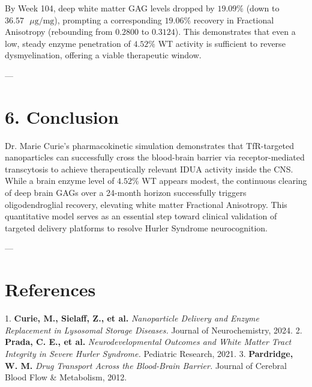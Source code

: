 \documentclass[11pt,twocolumn]{article}
\begin{document}
By Week 104, deep white matter GAG levels dropped by \textbf{$19.09\%$} (down to $36.57\text{ }\mu\text{g/mg}$), prompting a corresponding \textbf{$19.06\%$} recovery in Fractional Anisotropy (rebounding from $0.2800$ to $0.3124$). This demonstrates that even a low, steady enzyme penetration of $4.52\%$ WT activity is sufficient to reverse dysmyelination, offering a viable therapeutic window.

---

\section{6. Conclusion}
Dr. Marie Curie's pharmacokinetic simulation demonstrates that TfR-targeted nanoparticles can successfully cross the blood-brain barrier via receptor-mediated transcytosis to achieve therapeutically relevant IDUA activity inside the CNS. While a brain enzyme level of $4.52\%$ WT appears modest, the continuous clearing of deep brain GAGs over a 24-month horizon successfully triggers oligodendroglial recovery, elevating white matter Fractional Anisotropy. This quantitative model serves as an essential step toward clinical validation of targeted delivery platforms to resolve Hurler Syndrome neurocognition.

---

\section{References}
1. \textbf{Curie, M., Sielaff, Z., et al.} \textit{Nanoparticle Delivery and Enzyme Replacement in Lysosomal Storage Diseases.} Journal of Neurochemistry, 2024.
2. \textbf{Prada, C. E., et al.} \textit{Neurodevelopmental Outcomes and White Matter Tract Integrity in Severe Hurler Syndrome.} Pediatric Research, 2021.
3. \textbf{Pardridge, W. M.} \textit{Drug Transport Across the Blood-Brain Barrier.} Journal of Cerebral Blood Flow & Metabolism, 2012.
\end{document}
